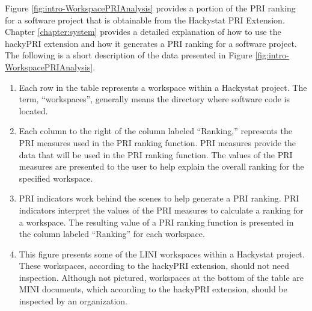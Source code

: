 Figure \ref{fig:intro-WorkspacePRIAnalysis} provides a portion of the PRI
ranking for a software project that is obtainable from the Hackystat PRI
Extension. Chapter \ref{chapter:system} provides a detailed explanation of
how to use the hackyPRI extension and how it generates a PRI ranking for a
software project. The following is a short description of the data
presented in Figure \ref{fig:intro-WorkspacePRIAnalysis}.

\begin{enumerate}
\item Each row in the table represents a workspace within a Hackystat
  project. The term, ``workspaces'', generally means the directory where
  software code is located.
\item Each column to the right of the column labeled ``Ranking,''
  represents the PRI measures used in the PRI ranking function. PRI
  measures provide the data that will be used in the PRI ranking function.
  The values of the PRI measures are presented to the user to help explain
  the overall ranking for the specified workspace.
\item PRI indicators work behind the scenes to help generate a PRI ranking.
  PRI indicators interpret the values of the PRI measures to calculate a
  ranking for a workspace. The resulting value of a PRI ranking function is
  presented in the column labeled ``Ranking'' for each workspace.
\item This figure presents some of the LINI workspaces within a Hackystat
  project. These workspaces, according to the hackyPRI extension, should
  not need inspection. Although not pictured, workspaces at the bottom of
  the table are MINI documents, which according to the hackyPRI extension,
  should be inspected by an organization.
\end{enumerate}

